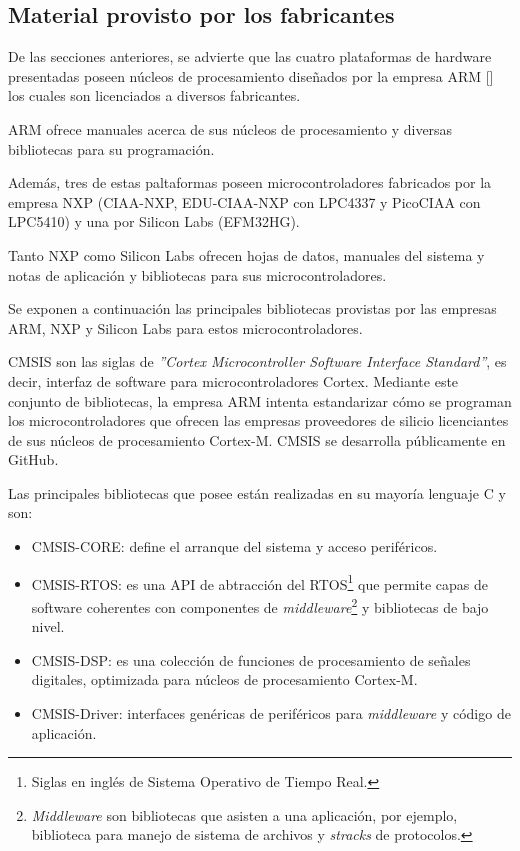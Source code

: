 \subsection{Material provisto por los fabricantes}

De las secciones anteriores, se advierte que las cuatro plataformas de hardware presentadas poseen núcleos de procesamiento diseñados por la empresa ARM [] los cuales son licenciados a diversos fabricantes.

ARM ofrece manuales acerca de sus núcleos de procesamiento y diversas bibliotecas para su programación.

Además, tres de estas paltaformas poseen microcontroladores fabricados por la empresa NXP (CIAA-NXP, EDU-CIAA-NXP con LPC4337 y PicoCIAA con LPC5410) y una por Silicon Labs (EFM32HG). 

Tanto NXP como Silicon Labs ofrecen hojas de datos, manuales del sistema y notas de aplicación y bibliotecas para sus microcontroladores.

Se exponen a continuación las principales bibliotecas provistas por las empresas ARM, NXP y Silicon Labs para estos microcontroladores.


CMSIS son las siglas de \emph{''Cortex Microcontroller Software Interface Standard''}, es decir, interfaz de software para microcontroladores Cortex. Mediante este conjunto de bibliotecas, la empresa ARM intenta estandarizar cómo se programan los microcontroladores que ofrecen las empresas proveedores de silicio licenciantes de sus núcleos de procesamiento Cortex-M. CMSIS se desarrolla públicamente en GitHub. 

Las principales bibliotecas que posee están realizadas en su mayoría lenguaje C y son:

\begin{itemize}
\item
CMSIS-CORE: define el arranque del sistema y acceso periféricos.
\item
CMSIS-RTOS: es una API de abtracción del RTOS\footnote{Siglas en inglés de Sistema Operativo de Tiempo Real.} que permite capas de software coherentes con componentes de \emph{middleware}\footnote{\emph{Middleware} son bibliotecas que asisten a una aplicación, por ejemplo, biblioteca para manejo de sistema de archivos y \emph{stracks} de protocolos.} y bibliotecas de bajo nivel.
\item
CMSIS-DSP: es una colección de funciones de procesamiento de señales digitales, optimizada para núcleos de procesamiento Cortex-M.
\item
CMSIS-Driver: interfaces genéricas de periféricos para \emph{middleware} y código de aplicación.
\end{itemize}

